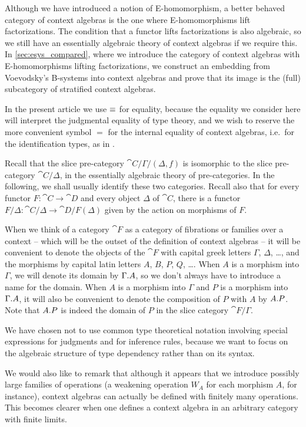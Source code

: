 Although we have introduced a notion of E-homomorphism, a better behaved category
of context algebras is the one where E-homomorphisms lift factorizations. The condition
that a functor lifts factorizations is also algebraic, so we still have an
essentially algebraic theory of context algebras if we require this.
In \autoref{sec:esys_compared}, where we introduce the category of context algebras
with E-homomorphisms lifting factorizations, we construct an embedding from Voevodsky's
B-systems into context algebras and prove that its image is the (full) subcategory
of stratified context algebras. 

\begin{rmk}
In the present article we use $\equiv$ for equality, because the equality we
consider here will interpret the judgmental equality of type theory, 
and we wish to reserve
the more convenient symbol $=$ for the internal equality of context algebras, i.e.~for
the identification types, as in \cite{TheBook}. 
\end{rmk}

\begin{rmk}
Recall that the slice pre-category $\cat{C}/\Gamma/(\Delta,f)$ is isomorphic to the slice pre-category
$\cat{C}/\Delta$, in the essentially algebraic theory of pre-categories. In the following,
we shall usually identify these two categories. Recall also that for every functor
$F:\cat{C}\to\cat{D}$ and every object $\Delta$ of $\cat{C}$, there is a functor
$F/\Delta:\cat{C}/\Delta\to \cat{D}/F(\Delta)$ given by the action on morphisms of $F$. 
\end{rmk}

\begin{rmk}
When we think of a category $\cat{F}$ as a category of fibrations or families
over a context -- which will be the outset of the definition of context algebras --
it will be convenient to denote the objects of the $\cat{F}$ with capital
greek letters $\Gamma$, $\Delta$, \ldots, and the morphisms by capital latin letters
$A$, $B$, $P$, $Q$, \ldots. When $A$ is a morphism into $\Gamma$, we will denote
its domain by $\ctxext{\Gamma}{A}$, so we don't always have to introduce a name
for the domain. When $A$ is a morphism into $\Gamma$ and
$P$ is a morphism into $\ctxext{\Gamma}{A}$, it will also be convenient to denote the
composition of $P$ with $A$ by $\ctxext{A}{P}$. Note that $\ctxext{A}{P}$
is indeed the domain of $P$ in the slice category $\cat{F}/\Gamma$.
\end{rmk}

\begin{rmk}
We have chosen not to use common type theoretical notation involving special
expressions for judgments and for inference rules, because we want to focus
on the algebraic structure of type dependency rather than on its syntax.

We would also like to remark that although it appears that we introduce possibly
large families of operations (a weakening operation $W_A$ for each morphism $A$,
for instance), context algebras can actually be defined with finitely many
operations. This becomes clearer when one defines a context algebra in an arbitrary
category with finite limits.
\end{rmk}

